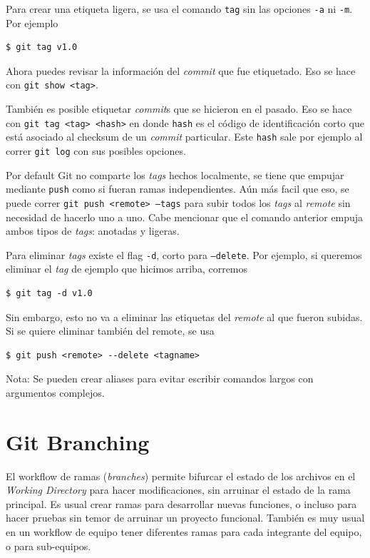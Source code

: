 \documentclass[spanish, 12pt, a4paper]{article}
\begin{document}
Para crear una etiqueta ligera, se usa el comando \texttt{tag} sin las opciones \texttt{-a} ni \texttt{-m}.
Por ejemplo
\begin{lstlisting}
$ git tag v1.0
\end{lstlisting}

Ahora puedes revisar la información del \textit{commit} que fue etiquetado.
Eso se hace con \texttt{git show <tag>}.

También es posible etiquetar \textit{commit}s que se hicieron en el pasado.
Eso se hace con \texttt{git tag <tag> <hash>} en donde \texttt{hash} es el código de identificación corto que está asociado al checksum de un \textit{commit} particular.
Este \texttt{hash} sale por ejemplo al correr \texttt{git log} con sus posibles opciones.

Por default Git no comparte los \textit{tags} hechos localmente, se tiene que empujar mediante \texttt{push} como si fueran ramas independientes.
Aún más facil que eso, se puede correr \texttt{git push <remote> --tags} para subir todos los \textit{tags} al \textit{remote} sin necesidad de hacerlo uno a uno.
Cabe mencionar que el comando anterior empuja ambos tipos de \textit{tags}: anotadas y ligeras.

Para eliminar \textit{tags} existe el flag \texttt{-d}, corto para \texttt{--delete}.
Por ejemplo, si queremos eliminar el \textit{tag} de ejemplo que hicimos arriba, corremos
\begin{lstlisting}
$ git tag -d v1.0
\end{lstlisting}
Sin embargo, esto no va a eliminar las etiquetas del \textit{remote} al que fueron subidas.
Si se quiere eliminar también del remote, se usa
\begin{lstlisting}
$ git push <remote> --delete <tagname>
\end{lstlisting}


Nota: Se pueden crear aliases para evitar escribir comandos largos con argumentos complejos.

\section{Git Branching}
El workflow de ramas (\textit{branches}) permite bifurcar el estado de los archivos en el \textit{Working Directory} para hacer modificaciones, sin arruinar el estado de la rama principal.
Es usual crear ramas para desarrollar nuevas funciones, o incluso para hacer pruebas sin temor de arruinar un proyecto funcional.
También es muy usual en un workflow de equipo tener diferentes ramas para cada integrante del equipo, o para sub-equipos.
\end{document}
